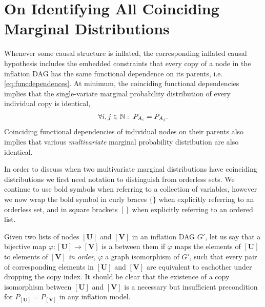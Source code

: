 \section{On Identifying All Coinciding Marginal Distributions}\label{sec:coincidingdetails}


Whenever some causal structure is inflated, the corresponding inflated causal hypothesis includes the embedded constraints that every copy of a node in the inflation DAG has the same functional dependence on its parents, i.e. \cref{eq:funcdependences}. At minimum, the coinciding functional dependencies implies that the single-variate marginal probability distribution of every individual copy is identical,
\begin{align}
     \forall i,j \in \mathbb{N}:\; P_{A_i}=P_{A_j}.
\end{align}
Coinciding functional dependencies of individual nodes on their parents also implies that various \emph{multivariate} marginal probability distribution are also identical.

In order to discuss when two multivariate marginal distributions have coinciding distributions we first need notation to distinguish  from orderless sets. We continue to use bold symbols when referring to a collection of variables, however we now wrap the bold symbol in curly braces $\{\}$ when explicitly referring to an orderless set, and in square brackets $[]$ when explicitly referring to an ordered list.

Given two lists of nodes $[\bm{U}]$ and $[\bm{V}]$ in an inflation DAG $G'$, let us say that a bijective map $\varphi:[\bm{U}]\bm{\to}[\bm{V}]$ is a  between them if $\varphi$ maps the elements of $[\bm{U}]$ to elements of $[\bm{V}]$ \emph{in order},  $\varphi$ a graph isomorphism of $G'$,  such that every pair of corresponding elements in $[\bm{U}]$ and $[\bm{V}]$ are equivalent to eachother under dropping the copy index. It should be clear that the existence of a copy isomorphism between $[\bm{U}]$ and $[\bm{V}]$ is a necessary but insufficient precondition for $P_{[\bm{U}]} = P_{[\bm{V}]}$ in any inflation model.

